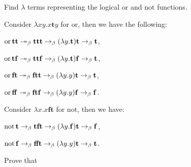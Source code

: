 \documentclass{homework}
\begin{document}
\begin{problem}
  Find $\lambda$ terms representing the logical $\mathrm{or}$ and $\mathrm{not}$
  functions.
\end{problem}

\begin{solution}
  Consider $\lambda xy.x\mathbf{t}y$ for $\mathrm{or}$, then we have the following:

  $\mathrm{or}\, \mathbf{t}\mathbf{t} \twoheadrightarrow_{\beta} \mathbf{t}\mathbf{t}\mathbf{t} \rightarrow_{\beta} (\lambda y.\mathbf{t})\mathbf{t} \rightarrow_{\beta} \mathbf{t}$,

  $\mathrm{or}\, \mathbf{t}\mathbf{f} \twoheadrightarrow_{\beta} \mathbf{t}\mathbf{t}\mathbf{f} \rightarrow_{\beta} (\lambda y.\mathbf{t})\mathbf{f} \rightarrow_{\beta} \mathbf{t}$,

  $\mathrm{or}\, \mathbf{f}\mathbf{t} \twoheadrightarrow_{\beta} \mathbf{f}\mathbf{t}\mathbf{t} \rightarrow_{\beta} (\lambda y.y)\mathbf{t} \rightarrow_{\beta} \mathbf{t}$,

  $\mathrm{or}\, \mathbf{f}\mathbf{f} \twoheadrightarrow_{\beta} \mathbf{f}\mathbf{t}\mathbf{f} \rightarrow_{\beta} (\lambda y.y)\mathbf{f} \rightarrow_{\beta} \mathbf{f}$.

  Consider $\lambda x.x\mathbf{f}\mathbf{t}$ for $\mathrm{not}$, then we have:

  $\mathrm{not}\, \mathbf{t} \rightarrow_{\beta} \mathbf{t}\mathbf{f}\mathbf{t} \rightarrow_{\beta} (\lambda y.\mathbf{f})\mathbf{t} \rightarrow_{\beta} \mathbf{f}$,

  $\mathrm{not}\, \mathbf{f} \rightarrow_{\beta} \mathbf{f}\mathbf{f}\mathbf{t} \rightarrow_{\beta} (\lambda y.y)\mathbf{t} \rightarrow_{\beta} \mathbf{t}$.
\end{solution}

\begin{problem}
  Prove that
\end{problem}
\end{document}
